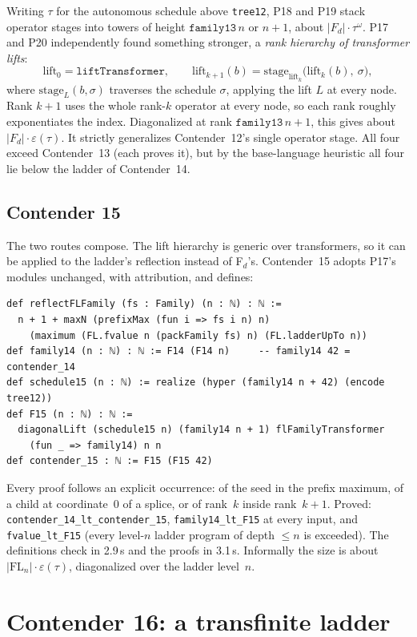 \documentclass[11pt]{article}
\theoremstyle{definition}
\theoremstyle{remark}
\newcommand{\lean}[1]{\texttt{#1}}
\begin{document}
Writing $\tau$ for the autonomous schedule above \lean{tree12}, P18 and P19
stack operator stages into towers of height $\mathtt{family13}\,n$ or $n+1$,
about $|F_d|\cdot\tau^\omega$. P17 and P20 independently found something
stronger, a \emph{rank hierarchy of transformer lifts}:
\[
\mathrm{lift}_0 = \mathtt{liftTransformer},\qquad
\mathrm{lift}_{k+1}(b) = \mathrm{stage}_{\mathrm{lift}_k}\bigl(\mathrm{lift}_k(b),\ \sigma\bigr),
\]
where $\mathrm{stage}_L(b,\sigma)$ traverses the schedule $\sigma$, applying
the lift $L$ at every node. Rank $k+1$ uses the whole rank-$k$ operator at
every node, so each rank roughly exponentiates the index. Diagonalized at rank
$\mathtt{family13}\,n+1$, this gives about $|F_d|\cdot\varepsilon(\tau)$. It
strictly generalizes Contender~12's single operator stage. All four exceed
Contender~13 (each proves it), but by the base-language heuristic all four lie
below the ladder of Contender~14.

\subsection{Contender 15}
The two routes compose. The lift hierarchy is generic over transformers, so it
can be applied to the ladder's reflection instead of F$_d$'s. Contender~15
adopts P17's modules unchanged, with attribution, and defines:
\begin{lstlisting}
def reflectFLFamily (fs : Family) (n : ℕ) : ℕ :=
  n + 1 + maxN (prefixMax (fun i => fs i n) n)
    (maximum (FL.fvalue n (packFamily fs) n) (FL.ladderUpTo n))
def family14 (n : ℕ) : ℕ := F14 (F14 n)     -- family14 42 = contender_14
def schedule15 (n : ℕ) := realize (hyper (family14 n + 42) (encode tree12))
def F15 (n : ℕ) : ℕ :=
  diagonalLift (schedule15 n) (family14 n + 1) flFamilyTransformer
    (fun _ => family14) n n
def contender_15 : ℕ := F15 (F15 42)
\end{lstlisting}
Every proof follows an explicit occurrence: of the seed in the prefix
maximum, of a child at coordinate~0 of a splice, or of rank~$k$ inside
rank~$k+1$. Proved: \lean{contender\_14\_lt\_\allowbreak contender\_15},
\lean{family14\_lt\_F15} at every input, and \lean{fvalue\_lt\_F15} (every
level-$n$ ladder program of depth $\le n$ is exceeded). The definitions check
in 2.9\,s and the proofs in 3.1\,s. Informally the size is about
$|\mathrm{FL}_n|\cdot\varepsilon(\tau)$, diagonalized over the ladder level~$n$.

\section{Contender 16: a transfinite ladder}
\end{document}
